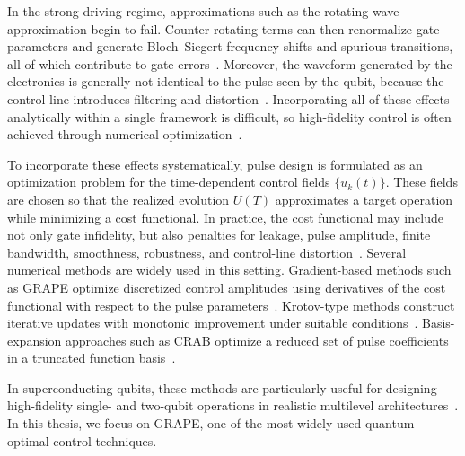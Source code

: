 In the strong-driving regime, approximations such as the rotating-wave approximation begin to fail. Counter-rotating terms can then renormalize gate parameters and generate Bloch--Siegert frequency shifts and spurious transitions, all of which contribute to gate errors~\cite{Petrescu2023,Pietikainen2017,Rower2024}. Moreover, the waveform generated by the electronics is generally not identical to the pulse seen by the qubit, because the control line introduces filtering and distortion~\cite{Rol2020,Guo2024,Hyyppa2024}. Incorporating all of these effects analytically within a single framework is difficult, so high-fidelity control is often achieved through numerical optimization~\cite{Koch2022,Song2022,Werninghaus2021}.

To incorporate these effects systematically, pulse design is formulated as an optimization problem for the time-dependent control fields $\{u_k(t)\}$. These fields are chosen so that the realized evolution $U(T)$ approximates a target operation while minimizing a cost functional. In practice, the cost functional may include not only gate infidelity, but also penalties for leakage, pulse amplitude, finite bandwidth, smoothness, robustness, and control-line distortion~\cite{Khaneja2005,Reich2012,Song2022}. Several numerical methods are widely used in this setting. Gradient-based methods such as GRAPE optimize discretized control amplitudes using derivatives of the cost functional with respect to the pulse parameters~\cite{Khaneja2005}. Krotov-type methods construct iterative updates with monotonic improvement under suitable conditions~\cite{Palao2003,Reich2012}. Basis-expansion approaches such as CRAB optimize a reduced set of pulse coefficients in a truncated function basis~\cite{Caneva2011}. 

In superconducting qubits, these methods are particularly useful for designing high-fidelity single- and two-qubit operations in realistic multilevel architectures~\cite{Werninghaus2021,Huang2014,Rol2020,Song2022}. In this thesis, we focus on GRAPE, one of the most widely used quantum optimal-control techniques.
